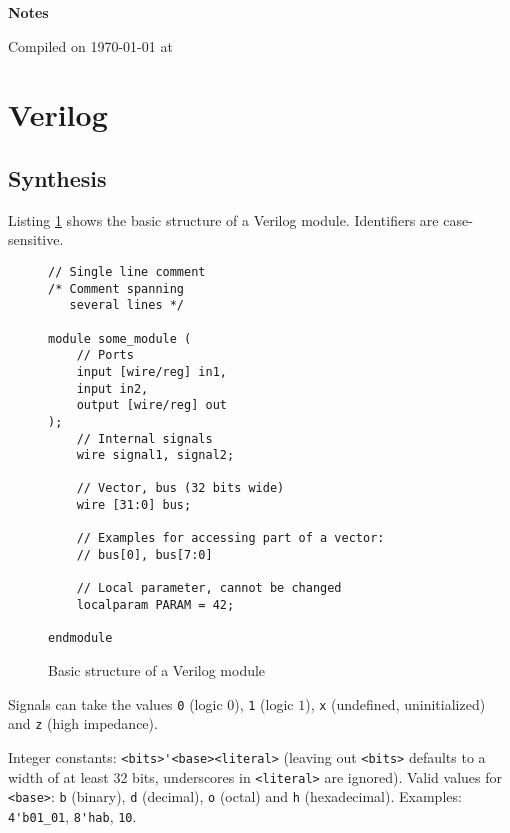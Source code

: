 \documentclass[fontsize=11pt,a4paper]{scrartcl}
\begin{document}
\clearpage
\begingroup
	\pagestyle{empty}
	\begin{center}
		\LARGE{\textbf{Notes}}

		\small{Compiled on {\today} at \currenttime}
	\end{center}
	\hfill
	\tableofcontents
	\clearpage
\endgroup
\newpage
\setcounter{page}{1}
%
%
%
%
\lstset{numbers=left,
	frame=single,
	numberstyle=\tiny,
	basicstyle=\footnotesize,
	showstringspaces=false,
	tabsize=3,
	numbersep=5pt,
}
%
%
%
\section{Verilog}
\subsection{Synthesis}
\lstset{language=verilog}
Listing \ref{lst:basic_structure} shows the basic structure of a Verilog module. Identifiers are case-sensitive.
\begin{figure}[htb]
\begin{lstlisting}
// Single line comment
/* Comment spanning
   several lines */

module some_module (
	// Ports
	input [wire/reg] in1,
	input in2,
	output [wire/reg] out
);
	// Internal signals
	wire signal1, signal2;

	// Vector, bus (32 bits wide)
	wire [31:0] bus;

	// Examples for accessing part of a vector:
	// bus[0], bus[7:0]

	// Local parameter, cannot be changed
	localparam PARAM = 42;

endmodule
\end{lstlisting}
\caption{Basic structure of a Verilog module}
\label{lst:basic_structure}
\end{figure}

Signals can take the values \lstinline!0! (logic $0$), \lstinline!1! (logic $1$), \lstinline!x! (undefined, uninitialized) and \lstinline!z! (high impedance).

Integer constants: \lstinline!<bits>'<base><literal>! (leaving out \lstinline!<bits>! defaults to a width of at least 32 bits, underscores in \lstinline!<literal>! are ignored). Valid values for \lstinline!<base>!: \lstinline!b! (binary), \lstinline!d! (decimal), \lstinline!o! (octal) and \lstinline!h! (hexadecimal). Examples: \lstinline!4'b01_01!, \lstinline!8'hab!, \lstinline!10!.
\end{document}
